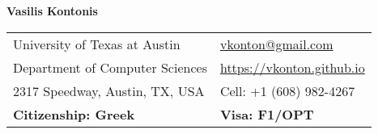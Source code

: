 \documentclass[letterpaper,11pt,oneside]{article}
\begin{document}

\noindent  \LARGE{\textbf{Vasilis Kontonis}}  \\
\vspace{-2ex}
\normalsize


\begin{center}
\begin{tabular}{l l}
 University of Texas at Austin& \hspace{1in} \href{mailto:vkonton@gmail.com}{vkonton@gmail.com} \\
 Department of Computer Sciences & \hspace{1in}  \href{https://vkonton.github.io}{https://vkonton.github.io}\\ 
 2317 Speedway, Austin, TX, USA & \hspace{1in} Cell: +1 (608) 982-4267 \\
 \textbf{Citizenship: Greek} & \hspace{1in} \textbf{Visa: F1/OPT}
\end{tabular}
\end{center}


\end{document}
